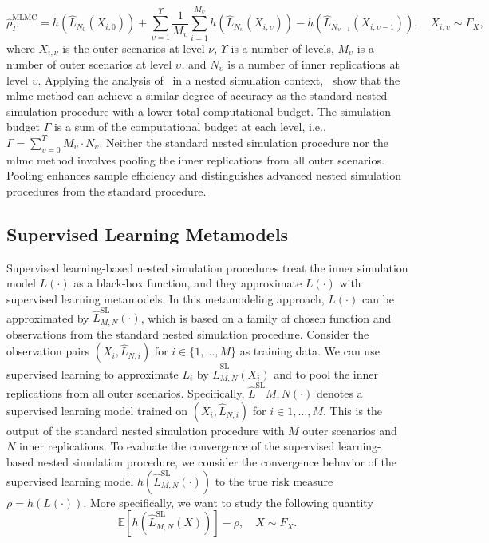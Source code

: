 \begin{equation*}
    \hat{\rho}^{\text{MLMC}}_\Gamma = h(\hat{L}_{N_{0}}(X_{i, 0})) + \sum_{\upsilon=1}^{\Upsilon}  \frac{1}{M_{\upsilon}} \sum_{i=1}^{M_{\upsilon}} h(\hat{L}_{N_{\upsilon}}(X_{i, \upsilon})) -  h(\hat{L}_{N_{\upsilon-1}}(X_{i, \upsilon-1}))  , \quad X_{i, \upsilon} \sim F_X,
\end{equation*}
where $X_{i, \nu}$ is the outer scenarios at level $\nu$, $\Upsilon$ is a number of levels, $M_{\upsilon}$ is a number of outer scenarios at level $\upsilon$, and $N_{\upsilon}$ is a number of inner replications at level $\upsilon$.
Applying the analysis of~\cite{giles2015multilevel} in a nested simulation context,~\cite{giles2019multilevel} show that the \gls{mlmc} method can achieve a similar degree of accuracy as the standard nested simulation procedure with a lower total computational budget.
The simulation budget $\Gamma$ is a sum of the computational budget at each level, i.e., $\Gamma = \sum_{\upsilon=0}^{\Upsilon} M_{\upsilon} \cdot N_{\upsilon}$.
Neither the standard nested simulation procedure nor the \gls{mlmc} method involves pooling the inner replications from all outer scenarios.
Pooling enhances sample efficiency and distinguishes advanced nested simulation procedures from the standard procedure.

\subsection{Supervised Learning Metamodels}

Supervised learning-based nested simulation procedures treat the inner simulation model $L(\cdot)$ as a black-box function, and they approximate $L(\cdot)$ with supervised learning metamodels.
In this metamodeling approach, $L(\cdot)$ can be approximated by $\hat{L}^{\text{SL}}_{M, N}(\cdot)$, which is based on a family of chosen function and observations from the standard nested simulation procedure.
Consider the observation pairs $(X_i, \hat{L}_{N, i})$ for $i \in \{1, \dots, M\}$ as training data.
We can use supervised learning to approximate $L_i$ by $\hat{L}_{M, N}^{\text{SL}}(X_i)$ and to pool the inner replications from all outer scenarios.
Specifically, $\hat{L}^{\text{SL}}{M, N}(\cdot)$ denotes a supervised learning model trained on $(X_i, \hat{L}_{N, i})$ for $i \in {1, \dots, M}$.
This is the output of the standard nested simulation procedure with $M$ outer scenarios and $N$ inner replications.
To evaluate the convergence of the supervised learning-based nested simulation procedure, we consider the convergence behavior of the supervised learning model $h(\hat{L}^{\text{SL}}_{M, N}(\cdot))$ to the true risk measure $\rho = h(L(\cdot))$.
More specifically, we want to study the following quantity
\begin{equation}\label{eq1:sl-E}
    \mathbb{E} \left[ h(\hat{L}^{\text{SL}}_{M, N}(X))   \right] - \rho, \quad X \sim F_X.
\end{equation}

